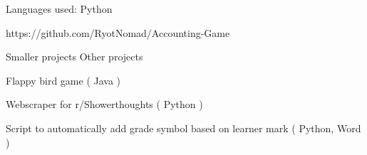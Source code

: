\documentclass[]{awesome-cv}
\begin{document}
\begin{cventries}
{\begin{cvitems}
		\item {Languages used: Python}
		\item {https://github.com/RyotNomad/Accounting-Game}
		\end{cvitems}}
	\cventry
	{Smaller projects}
	{Other projects}
	{}
	{}
	{\begin{cvitems}
		\item {Flappy bird game ( Java )}
		\item {Webscraper for r/Showerthoughts ( Python )}
		\item {Script to automatically add grade symbol based on learner mark ( Python, Word )}
		\end{cvitems}}
\end{cventries}

\vspace{-3mm}
\end{document}
